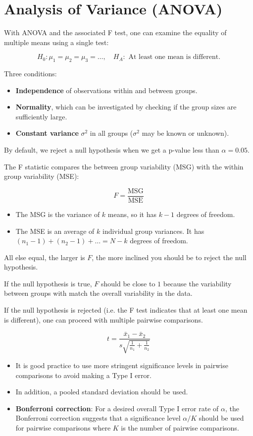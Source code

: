\section{Analysis of Variance (ANOVA)}

With ANOVA and the associated F test, one can examine the equality of multiple means using a single test:

$$H_0: \mu_1 = \mu_2 = \mu_3 = \dots, \quad H_A: \text{ At least one mean is different.}$$

Three conditions:
\begin{itemize}
    \item \textbf{Independence} of observations within and between groups.
    \item \textbf{Normality}, which can be investigated by checking if the group sizes are sufficiently large.
    \item \textbf{Constant variance} $\sigma^2$ in all groups ($\sigma^2$ may be known or unknown).
\end{itemize}

By default, we reject a null hypothesis when we get a p-value less than $\alpha = 0.05$.

The F statistic compares the between group variability (MSG) with the within group variability (MSE):

$$F = \frac{\text{MSG}}{\text{MSE}}$$

\begin{itemize}
    \item The MSG is the variance of $k$ means, so it has $k - 1$ degrees of freedom.
    \item The MSE is an average of $k$ individual group variances. It has $(n_1 - 1) + (n_2 - 1) + \dots = N - k$ degrees of freedom.
\end{itemize}

All else equal, the larger is $F$, the more inclined you should be to reject the null hypothesis.

If the null hypothesis is true, $F$ should be close to $1$ because the variability between groups with match the overall variability in the data.

If the null hypothesis is rejected (i.e. the F test indicates that at least one mean is different), one can proceed with multiple pairwise comparisons.

$$t = \frac{\bar{x}_1 - \bar{x}_2}{s \sqrt{\frac{1}{n_1} + \frac{1}{n_2}}}$$

\begin{itemize}
    \item It is good practice to use more stringent significance levels in pairwise comparisons to avoid making a Type I error.

    \item In addition, a pooled standard deviation should be used.

    \item \textbf{Bonferroni correction}: For a desired overall Type I error rate of $\alpha$, the Bonferroni correction suggests that a significance level $\alpha / K$ should be used for pairwise comparisons where $K$ is the number of pairwise comparisons.
\end{itemize}

